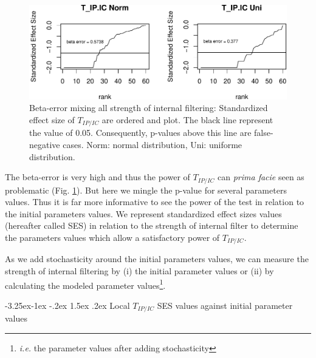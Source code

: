 \documentclass[12pt]{article}\usepackage[]{graphicx}\usepackage[]{color}
\makeatletter
\def\maxwidth{ %
  \ifdim\Gin@nat@width>\linewidth
    \linewidth
  \else
    \Gin@nat@width
  \fi
}
\newenvironment{knitrout}{}{} %
\newcounter {subsubsubsection}[subsubsection]
\newcommand\subsubsubsection{\@startsection{subsubsubsection}{4}{\z@}%
          {-3.25ex\@plus -1ex \@minus -.2ex}%
          {1.5ex \@plus .2ex}%
          {\normalfont\normalsize\bfseries}}
\makeatother
\begin{document}
\begin{knitrout}
\begin{figure}
{\centering \includegraphics[width=\maxwidth]{figure/Internal_filter_results_pval_local-1} 

}

\caption[Beta-error mixing all strength of internal filtering]{Beta-error mixing all strength of internal filtering: Standardized effect size of $T_{IP/IC}$ are ordered and plot. The black line represent the value of 0.05. Consequently, p-values above this line are false-negative cases. Norm: normal distribution, Uni: uniforme distribution. }\label{fig:Internal_filter_results_pval_local}
\end{figure}


\end{knitrout}

The beta-error is very high and thus the power of $T_{IP/IC}$ can \textit{prima facie} seen as problematic (Fig. \ref{fig:Internal_filter_results_pval_local}). But here we mingle the p-value for several parameters values. Thus it is far more informative to see the power of the test in relation to the initial parameters values. We represent standardized effect sizes values (hereafter called SES) in relation to the strength of internal filter to determine the parameters values which allow a satisfactory power of $T_{IP/IC}$.

As we add stochasticity around the initial parameters values, we can measure the strength of internal filtering by (i) the initial parameter values or (ii) by calculating the modeled parameter values\footnote{\textit{i.e.} the parameter values after adding stochasticity}.
 
  \subsubsubsection {Local $T_{IP/IC}$ SES values against initial parameter values}
\end{document}
